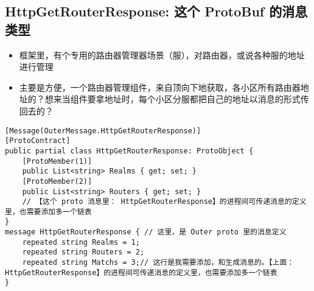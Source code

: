 \documentclass[9pt, b5paper]{article}
\begin{document}
\subsection{HttpGetRouterResponse: 这个 ProtoBuf 的消息类型}
\label{sec-6-3}
\begin{itemize}
\item 框架里，有个专用的路由器管理器场景（服），对路由器，或说各种服的地址进行管理
\item 主要是方便，一个路由器管理组件，来自顶向下地获取，各小区所有路由器地址的？想来当组件要拿地址时，每个小区分服都把自己的地址以消息的形式传回去的？
\end{itemize}
\begin{verbatim}
[Message(OuterMessage.HttpGetRouterResponse)]
[ProtoContract]
public partial class HttpGetRouterResponse: ProtoObject {
    [ProtoMember(1)]
    public List<string> Realms { get; set; }
    [ProtoMember(2)]
    public List<string> Routers { get; set; }
    // 【这个 proto 消息里： HttpGetRouterResponse】的进程间可传递消息的定义里，也需要添加多一个链表
}
message HttpGetRouterResponse { // 这里，是 Outer proto 里的消息定义
    repeated string Realms = 1;
    repeated string Routers = 2;
    repeated string Matchs = 3;// 这行是我需要添加，和生成消息的。【上面： HttpGetRouterResponse】的进程间可传递消息的定义里，也需要添加多一个链表
}
\end{verbatim}
\end{document}
